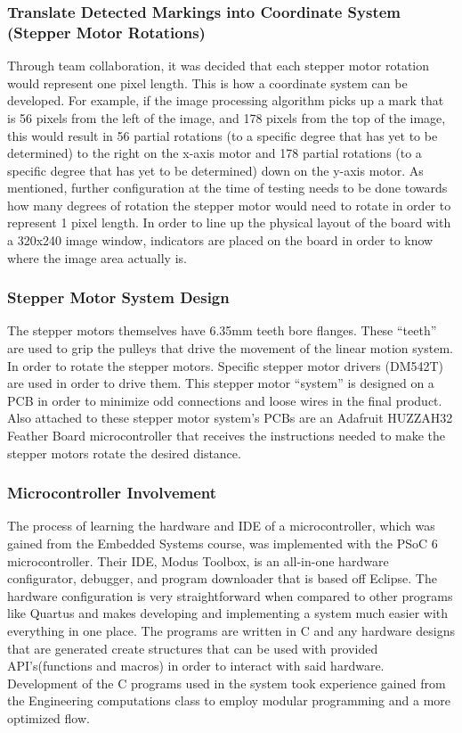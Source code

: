 \subsubsection{Translate Detected Markings into Coordinate System (Stepper Motor Rotations)}
Through team collaboration, it was decided that each stepper motor rotation would represent one pixel length. This is how a coordinate system can be developed. For example, if the image processing algorithm picks up a mark that is 56 pixels from the left of the image, and 178 pixels from the top of the image, this would result in 56 partial rotations (to a specific degree that has yet to be determined) to the right on the x-axis motor and 178 partial rotations (to a specific degree that has yet to be determined) down on the y-axis motor. As mentioned, further configuration at the time of testing needs to be done towards how many degrees of rotation the stepper motor would need to rotate in order to represent 1 pixel length. In order to line up the physical layout of the board with a 320x240 image window, indicators are placed on the board in order to know where the image area actually is.\\
\subsubsection{Stepper Motor System Design}
The stepper motors themselves have 6.35mm teeth bore flanges. These ``teeth'' are used to grip the pulleys that drive the movement of the linear motion system. In order to rotate the stepper motors. Specific stepper motor drivers (DM542T) are used in order to drive them. This stepper motor ``system'' is designed on a PCB in order to minimize odd connections and loose wires in the final product. Also attached to these stepper motor system's PCBs are an Adafruit HUZZAH32 Feather Board microcontroller that receives the instructions needed to make the stepper motors rotate the desired distance.\\
\subsubsection{Microcontroller Involvement}
The process of learning the hardware and IDE of a microcontroller, which was gained from the Embedded Systems course, was implemented with the PSoC 6 microcontroller. Their IDE, Modus Toolbox, is an all-in-one hardware configurator, debugger, and program downloader that is based off Eclipse. The hardware configuration is very straightforward when compared to other programs like Quartus and makes developing and implementing a system much easier with everything in one place. The programs are written in C and any hardware designs that are generated create structures that can be used with provided API's(functions and macros) in order to interact with said hardware. Development of the C programs used in the system took experience gained from the Engineering computations class to employ modular programming and a more optimized flow. \\

